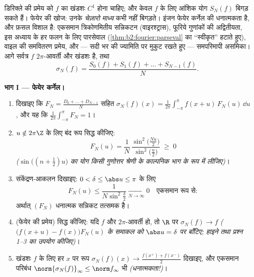 \begin{problem}\label{pb:b2:fourier:1}
डिरिक्ले की प्रमेय को $f$ का खंडशः $C^1$ होना चाहिए; और केवल  $f$ के
लिए आंशिक योग $S_N(f)$ बिगड़ सकते हैं। फेयेर की खोज: उनके \emph{चेज़ारो माध्य}
कभी नहीं बिगड़ते। इंजन फेयेर कर्नेल की धनात्मकता है, और फ़सल विशाल है:
एकसमान त्रिकोणमितीय सन्निकटन (वाइरश्ट्रास), फूरिये गुणांकों की
अद्वितीयता, इस अध्याय के हर फलन के लिए पारसेवाल (\cref{thm:b2:fourier:parseval} का ``स्वीकृत''
हटाते हुए), वाइल की समवितरण प्रमेय, और --- सदी भर की ज्यामिति पर मुकुट
रखते हुए --- समपरिमापी असमिका। आगे
सर्वत्र $f$ $2\pi$-आवर्ती और खंडशः  है, तथा
\[
\sigma_N(f) = \frac{S_0(f) + S_1(f) + \dots +
S_{N-1}(f)}{N} .
\]

\medskip
\noindent\textbf{भाग I --- फेयेर कर्नेल।}
\begin{enumerate}
  \item दिखाइए कि $F_N = \frac{D_0 + \dots + D_{N-1}}{N}$ सहित $\sigma_N(f)(x) =
        \frac{1}{2\pi}\int_{-\pi}^{\pi}f(x+u)\,F_N(u)\,\dd u$, और यह कि $\frac{1}{2\pi}\int_{-\pi}^{\pi}F_N = 1$।
  \item $u \notin 2\pi\Z$ के लिए बंद रूप सिद्ध कीजिए:
        \[
        F_N(u) = \frac{1}{N}\,
        \frac{\sin^2\bigl(\frac{Nu}{2}\bigr)}
        {\sin^2\bigl(\frac u2\bigr)} \;\geq\; 0
        \]
        \emph{($\sin\bigl((n+\frac12)u\bigr)$ का योग किसी गुणोत्तर श्रेणी के काल्पनिक भाग के रूप में
        लीजिए)}।
  \item संकेंद्रण-आकलन दिखाइए: $0 < \delta \leq
        \abs u \leq \pi$ के लिए
        \[
        F_N(u) \leq \frac{1}{N\sin^2\frac\delta2}
        \xrightarrow[N\to\infty]{} 0
        \quad\text{एकसमान रूप से} :
        \]
        अर्थात् $(F_N)$ धनात्मक सन्निकट तत्समक है।
  \item (फेयेर की प्रमेय) सिद्ध कीजिए: यदि $f$  और $2\pi$-आवर्ती हो,
        तो $\R$ पर \emph{} $\sigma_N(f) \to f$ \emph{($\bigl(f(x+u) - f(x)\bigr)F_N(u)$ के समाकल को $\abs u =
        \delta$
        पर बाँटिए; हाइने तथा प्रश्न 1--3 का उपयोग कीजिए)}।
  \item खंडशः  $f$ के लिए हर $x$ पर  रूप $\sigma_N(f)(x) \to \frac{f(x^+) +
        f(x^-)}{2}$ दिखाइए, और
        एकसमान परिबंध
        $\norm{\sigma_N(f)}_\infty \leq \norm f_\infty$
        भी \emph{(धनात्मकता!)}।
\end{enumerate}


\end{problem}
